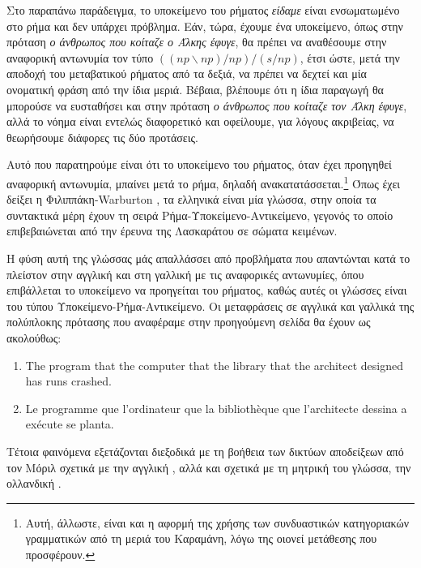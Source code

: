 \documentclass [a4paper,11pt] {book}
\theoremstyle{definition}
\theoremstyle{definition}
\begin{document}
Στο παραπάνω παράδειγμα, το υποκείμενο του ρήματος \textit{είδαμε} είναι ενσωματωμένο στο ρήμα και δεν υπάρχει πρόβλημα. Εάν, τώρα, έχουμε ένα υποκείμενο, όπως στην πρόταση \textit{ο άνθρωπος που κοίταζε ο Άλκης έφυγε}, θα πρέπει να αναθέσουμε στην αναφορική αντωνυμία τον τύπο $((np\backslash np)/np)/(s/np)$, έτσι ώστε, μετά την αποδοχή του μεταβατικού ρήματος από τα δεξιά, να πρέπει να δεχτεί και μία ονοματική φράση από την ίδια μεριά. Βέβαια, βλέπουμε ότι η ίδια παραγωγή θα μπορούσε να ευσταθήσει και στην πρόταση \textit{ο άνθρωπος που κοίταζε τον Άλκη έφυγε}, αλλά το νόημα είναι εντελώς διαφορετικό και οφείλουμε, για λόγους ακριβείας, να θεωρήσουμε διάφορες τις δύο προτάσεις.

Αυτό που παρατηρούμε είναι ότι το υποκείμενο του ρήματος, όταν έχει προηγηθεί αναφορική αντωνυμία, μπαίνει μετά το ρήμα, δηλαδή ανακατατάσσεται.\footnote{Αυτή, άλλωστε, είναι και η αφορμή της χρήσης των συνδυαστικών κατηγοριακών γραμματικών από τη μεριά του Καραμάνη, λόγω της οιονεί μετάθεσης που προσφέρουν.} Όπως έχει δείξει η Φιλιππάκη-Warburton \citep{filippaki1982}\citep{Filippakh-Warburton:85}, τα ελληνικά είναι μία γλώσσα, στην οποία τα συντακτικά μέρη έχουν τη σειρά Ρήμα-Υποκείμενο-Αντικείμενο, γεγονός το οποίο επιβεβαιώνεται από την έρευνα της Λασκαράτου \citep{laskaratou} σε σώματα κειμένων.
 
Η φύση αυτή της γλώσσας μάς απαλλάσσει από προβλήματα που απαντώνται κατά το πλείστον στην αγγλική και στη γαλλική με τις αναφορικές αντωνυμίες, όπου επιβάλλεται το υποκείμενο να προηγείται του ρήματος, καθώς αυτές οι γλώσσες είναι του τύπου Υποκείμενο-Ρήμα-Αντικείμενο. Οι μεταφράσεις σε αγγλικά και γαλλικά της πολύπλοκης πρότασης που αναφέραμε στην προηγούμενη σελίδα θα έχουν ως ακολούθως:
\begin{enumerate}[(1)]
\item The program that the computer that the library that the architect designed has runs crashed.
\item Le programme que l'ordinateur que la bibliothèque que l'architecte dessina a exécute se planta.
\end{enumerate}
Τέτοια φαινόμενα εξετάζονται διεξοδικά με τη βοήθεια των δικτύων αποδείξεων από τον Μόριλ σχετικά με την αγγλική \citep{Morrill00incrementalprocessing}, αλλά και σχετικά με τη μητρική του γλώσσα, την ολλανδική \citep{Morrill_grammarand}.
\end{document}

